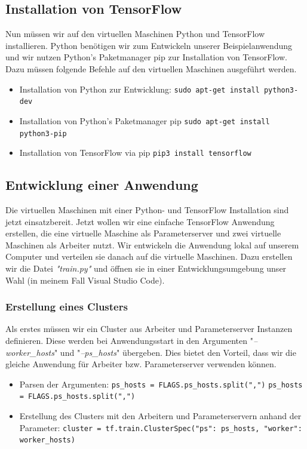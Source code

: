 \subsection{Installation von TensorFlow}
Nun müssen wir auf den virtuellen Maschinen Python und TensorFlow installieren. Python benötigen wir zum Entwickeln unserer Beispielanwendung und wir nutzen Python's Paketmanager pip zur Installation von TensorFlow. Dazu müssen folgende Befehle auf den virtuellen Maschinen ausgeführt werden.
\begin{itemize}
	\item Installation von Python zur Entwicklung:\newline
			\texttt{sudo apt-get install python3-dev}
	\item Installation von Python's Paketmanager pip\newline
			\texttt{sudo apt-get install python3-pip}
	\item Installation von TensorFlow via pip\newline
			\texttt{pip3 install tensorflow}
\end{itemize}

\subsection{Entwicklung einer Anwendung}
Die virtuellen Maschinen mit einer Python- und TensorFlow Installation sind jetzt einsatzbereit. Jetzt wollen wir eine einfache TensorFlow Anwendung erstellen, die eine virtuelle Maschine als Parameterserver und zwei virtuelle Maschinen als Arbeiter nutzt. Wir entwickeln die Anwendung lokal auf unserem Computer und verteilen sie danach auf die virtuelle Maschinen. Dazu erstellen wir die Datei \textit{"train.py"} und öffnen sie in einer Entwicklungsumgebung unser Wahl (in meinem Fall Visual Studio Code). 

\vspace{2mm}
\subsubsection{Erstellung eines Clusters}
Als erstes müssen wir ein Cluster aus Arbeiter und Parameterserver Instanzen definieren. Diese werden bei Anwendungsstart in den Argumenten "\textit{--worker\_hosts}" und "\textit{--ps\_hosts}" übergeben. Dies bietet den Vorteil, dass wir die gleiche Anwendung für Arbeiter bzw. Parameterserver verwenden können.

\begin{itemize}
	\item Parsen der Argumenten: \newline
		\texttt{ps\_hosts = FLAGS.ps\_hosts.split(",")} \newline
		\texttt{ps\_hosts = FLAGS.ps\_hosts.split(",")}
	\item Erstellung des Clusters mit den Arbeitern und Parameterservern anhand der Parameter: \newline
			\texttt{cluster = tf.train.ClusterSpec({"ps": ps\_hosts, "worker": worker\_hosts})}
\end{itemize}

